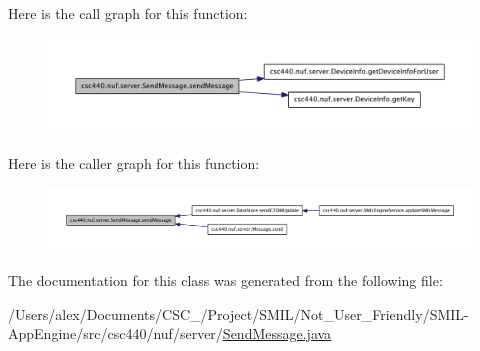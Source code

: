 Here is the call graph for this function\-:
\nopagebreak
\begin{figure}[H]
\begin{center}
\leavevmode
\includegraphics[width=350pt]{classcsc440_1_1nuf_1_1server_1_1_send_message_a0c14fe20917e68f73dda5a275ba2a7f2_cgraph}
\end{center}
\end{figure}




Here is the caller graph for this function\-:
\nopagebreak
\begin{figure}[H]
\begin{center}
\leavevmode
\includegraphics[width=350pt]{classcsc440_1_1nuf_1_1server_1_1_send_message_a0c14fe20917e68f73dda5a275ba2a7f2_icgraph}
\end{center}
\end{figure}




The documentation for this class was generated from the following file\-:\begin{DoxyCompactItemize}
\item 
/\-Users/alex/\-Documents/\-C\-S\-C\-\_/\-Project/\-S\-M\-I\-L/\-Not\-\_\-\-User\-\_\-\-Friendly/\-S\-M\-I\-L-\/\-App\-Engine/src/csc440/nuf/server/\hyperlink{_send_message_8java}{Send\-Message.\-java}\end{DoxyCompactItemize}
